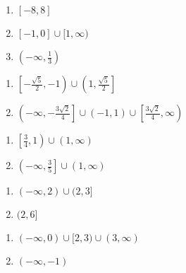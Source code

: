 \begin{multicols}{3}
\begin{enumerate}
\setcounter{enumi}{\value{HW}}

\item  $[-8,8]$    
\item  $[-1, 0] \cup [1, \infty)$  
\item $\left(-\infty, \frac{1}{3} \right)$

\setcounter{HW}{\value{enumi}}
\end{enumerate}
\end{multicols}

\begin{enumerate}
\setcounter{enumi}{\value{HW}}

\item $\left[ -\frac{\sqrt{5}}{2}, -1\right) \cup \left(1, \frac{\sqrt{5}}{2}\right]$
\item  $\left(-\infty, -\frac{3\sqrt{2}}{4} \right] \cup (-1,1) \cup \left[ \frac{3\sqrt{2}}{4}, \infty \right)$

\setcounter{HW}{\value{enumi}}
\end{enumerate}

\begin{multicols}{2}
\begin{enumerate}
\setcounter{enumi}{\value{HW}}


\item   $\left[ \frac{3}{4}, 1\right) \cup (1, \infty)$

\item $\left( -\infty, \frac{3}{5} \right] \cup (1, \infty)$

\setcounter{HW}{\value{enumi}}
\end{enumerate}
\end{multicols}

\begin{multicols}{2}
\begin{enumerate}
\setcounter{enumi}{\value{HW}}

\item  $(-\infty, 2) \cup (2,3]$
\item  $(2,6]$

\setcounter{HW}{\value{enumi}}
\end{enumerate}
\end{multicols}

\begin{multicols}{2}
\begin{enumerate}
\setcounter{enumi}{\value{HW}}

\item $(-\infty, 0) \cup [2,3) \cup (3, \infty)$
\item $(-\infty, -1)$  


\setcounter{HW}{\value{enumi}}
\end{enumerate}
\end{multicols}

